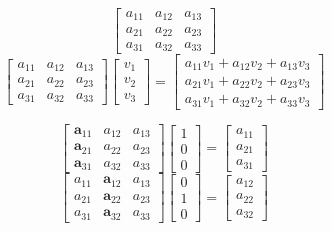 \documentclass[a4paper]{article}
\begin{document}
\[
	\begin{bmatrix} a_{11} & a_{12} & a_{13} \\
	a_{21} & a_{22} & a_{23} \\
a_{31} & a_{32} & a_{33} \end{bmatrix} 
\] 
\[
	\begin{bmatrix} a_{11} & a_{12} & a_{13} \\
	a_{21} & a_{22} & a_{23} \\
a_{31} & a_{32} & a_{33} \end{bmatrix} 
\begin{bmatrix} v_1 \\ v_2 \\ v_3 \end{bmatrix} 
=
\begin{bmatrix} a_{11} v_1 + a_{12} v_2 + a_{13} v_3 \\
a_{21} v_1  + a_{22} v_2 + a_{23} v_3 \\
a_{31} v_1 + a_{32} v_2 + a_{33} v_3 \end{bmatrix} 
\] 

\[
\boxed{
	\begin{bmatrix} \mathbf a_{11} & a_{12} & a_{13} \\
	\mathbf a_{21} & a_{22} & a_{23} \\
\mathbf a_{31} & a_{32} & a_{33} \end{bmatrix} 
\begin{bmatrix} 1 \\ 0 \\ 0 \end{bmatrix} = \begin{bmatrix} a_{11} \\ 
	a_{21} \\ a_{31} \end{bmatrix}  
}
\] 
\[
\boxed{	\begin{bmatrix} a_{11} & \mathbf a_{12} & a_{13} \\
	a_{21} & \mathbf a_{22} & a_{23} \\
a_{31} & \mathbf a_{32} & a_{33} \end{bmatrix} 
\begin{bmatrix} 0 \\ 1 \\ 0 \end{bmatrix} 
= 
\begin{bmatrix} a_{12} \\ a_{22} \\ a_{32} \end{bmatrix}  }
\] 
\end{document}
